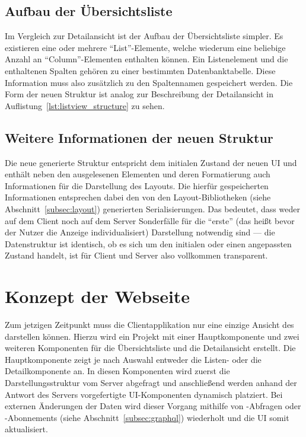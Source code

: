 \subsection{Aufbau der Übersichtsliste}
Im Vergleich zur Detailansicht ist der Aufbau der Übersichtsliste simpler. Es existieren eine oder mehrere \enquote{List}-Elemente, welche wiederum eine beliebige Anzahl an \enquote{Column}-Elementen enthalten können. Ein Listenelement und die enthaltenen Spalten gehören zu einer bestimmten Datenbanktabelle. Diese Information muss also zusätzlich zu den Spaltennamen gespeichert werden. Die Form der neuen Struktur ist analog zur Beschreibung der Detailansicht in Auflistung~\ref{lst:listview_structure} zu sehen.



\subsection{Weitere Informationen der neuen Struktur}
Die neue generierte Struktur entspricht dem initialen Zustand der neuen UI und enthält neben den ausgelesenen Elementen und deren Formatierung auch Informationen für die Darstellung des Layouts. Die hierfür gespeicherten Informationen entsprechen dabei den von den Layout-Bibliotheken (siehe Abschnitt~\ref{subsec:layout}) generierten Serialisierungen. Das bedeutet, dass weder auf dem Client noch auf dem Server Sonderfälle für die \enquote{erste} (das heißt bevor der Nutzer die Anzeige individualisiert) Darstellung notwendig sind --- die Datenstruktur ist identisch, ob es sich um den initialen oder einen angepassten Zustand handelt, ist für Client und Server also vollkommen transparent.

\section{Konzept der Webseite}
Zum jetzigen Zeitpunkt muss die Clientapplikation nur eine einzige Ansicht des  darstellen können. Hierzu wird ein Projekt mit einer Hauptkomponente und zwei weiteren Komponenten für die Übersichtsliste und die Detailansicht erstellt. Die Hauptkomponente zeigt je nach Auswahl entweder die Listen- oder die Detailkomponente an. In diesen Komponenten wird zuerst die Darstellungsstruktur vom Server abgefragt und anschließend werden anhand der Antwort des Servers vorgefertigte UI-Komponenten dynamisch platziert. Bei externen Änderungen der Daten wird dieser Vorgang mithilfe von -Abfragen oder -Abonnements (siehe Abschnitt~\ref{subsec:graphql}) wiederholt und die UI somit aktualisiert.


